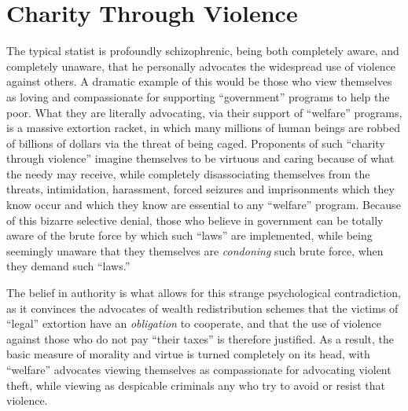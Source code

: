 \documentclass{book}
\begin{document}
\section{Charity Through Violence}

The typical statist is profoundly schizophrenic, being both completely aware, and completely unaware, that he personally advocates the widespread use of violence against others. A dramatic example of this would be those who view themselves as loving and compassionate for supporting \enquote{government} programs to help the poor. What they are literally advocating, via their support of \enquote{welfare} programs, is a massive extortion racket, in which many millions of human beings are robbed of billions of dollars via the threat of being caged. Proponents of such \enquote{charity through violence} imagine themselves to be virtuous and caring because of what the needy may receive, while completely disassociating themselves from the threats, intimidation, harassment, forced seizures and imprisonments which they know occur and which they know are essential to any \enquote{welfare} program. Because of this bizarre selective denial, those who believe in government can be totally aware of the brute force by which such \enquote{laws} are implemented, while being seemingly unaware that they themselves are \emph{condoning} such brute force, when they demand such \enquote{laws.}

The belief in authority is what allows for this strange psychological contradiction, as it convinces the advocates of wealth redistribution schemes that the victims of \enquote{legal} extortion have an \emph{obligation} to cooperate, and that the use of violence against those who do not pay \enquote{their taxes} is therefore justified. As a result, the basic measure of morality and virtue is turned completely on its head, with \enquote{welfare} advocates viewing themselves as compassionate for advocating violent theft, while viewing as despicable criminals any who try to avoid or resist that violence.
\end{document}
